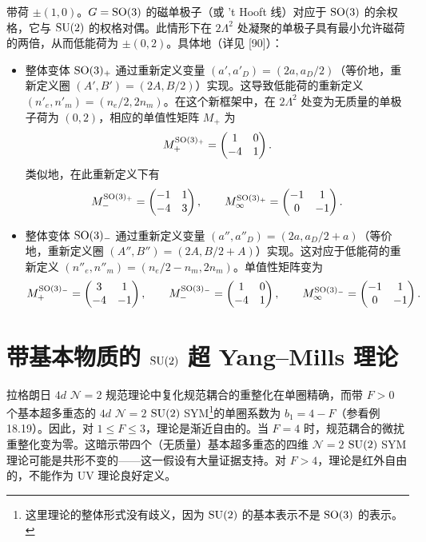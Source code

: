 带荷 $\pm(1,0)$。$G=\operatorname{SO}(3)$ 的磁单极子（或 't Hooft 线）对应于 $\operatorname{SO}(3)$ 的余权格，它与 $\operatorname{SU}(2)$ 的权格对偶。此情形下在 $2\Lambda^2$ 处凝聚的单极子具有最小允许磁荷的两倍，从而低能荷为 $\pm(0,2)$。具体地（详见 [90]）：
\begin{itemize}
\item 整体变体 $\operatorname{SO}(3)_+$ 通过重新定义变量 $(a',a'_D)=(2a,a_D/2)$（等价地，重新定义圈 $(A',B')=(2A,B/2)$）实现。这导致低能荷的重新定义 $(n'_e,n'_m)=(n_e/2,2n_m)$。在这个新框架中，在 $2\Lambda^2$ 处变为无质量的单极子荷为 $(0,2)$，相应的单值性矩阵 $M_+$ 为
\[
M^{\operatorname{SO}(3)_+}_+=\begin{pmatrix}1&0\\-4&1\end{pmatrix}.
\]
类似地，在此重新定义下有
\[
M^{\operatorname{SO}(3)_+}_-=\begin{pmatrix}-1&1\\-4&3\end{pmatrix},\qquad
M^{\operatorname{SO}(3)_+}_\infty=\begin{pmatrix}-1&1\\0&-1\end{pmatrix}.
\]
\item 整体变体 $\operatorname{SO}(3)_-$ 通过重新定义变量 $(a'',a''_D)=(2a,a_D/2+a)$（等价地，重新定义圈 $(A'',B'')=(2A,B/2+A)$）实现。这对应于低能荷的重新定义 $(n''_e,n''_m)=(n_e/2-n_m,2n_m)$。单值性矩阵变为
\[
M^{\operatorname{SO}(3)_-}_+=\begin{pmatrix}3&1\\-4&-1\end{pmatrix},\qquad
M^{\operatorname{SO}(3)_-}_-=\begin{pmatrix}1&0\\-4&1\end{pmatrix},\qquad
M^{\operatorname{SO}(3)_-}_\infty=\begin{pmatrix}-1&1\\0&-1\end{pmatrix}.
\]
\end{itemize}


\section{带基本物质的 $\operatorname{SU}(2)$ 超 Yang–Mills 理论}

拉格朗日 $4d$ $\mathcal{N}=2$ 规范理论中复化规范耦合的重整化在单圈精确，而带 $F>0$ 个基本超多重态的 $4d$ $\mathcal{N}=2$ $\operatorname{SU}(2)$ SYM\footnote{这里理论的整体形式没有歧义，因为 $\operatorname{SU}(2)$ 的基本表示不是 $\operatorname{SO}(3)$ 的表示。}的单圈系数为 $b_1=4-F$（参看例 18.19）。因此，对 $1\le F\le3$，理论是渐近自由的。当 $F=4$ 时，规范耦合的微扰重整化变为零。这暗示带四个（无质量）基本超多重态的四维 $\mathcal{N}=2$ $\operatorname{SU}(2)$ SYM 理论可能是共形不变的——这一假设有大量证据支持。对 $F>4$，理论是红外自由的，不能作为 UV 理论良好定义。

